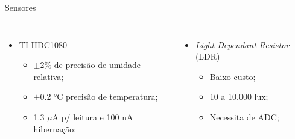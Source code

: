 \begin{frame}{Sensores}

\begin{columns}
        \centering
        \begin{itemize}
            \item TI HDC1080
            \begin{itemize}
                \item $\pm$2\% de precisão de umidade relativa;
                \item $\pm$0.2 °C precisão de temperatura;
                \item 1.3 $\mu$A p/ leitura e 100 nA hibernação;
            \end{itemize}
        \end{itemize}
        
        \centering
        \begin{itemize}
            \item \textit{Light Dependant Resistor} (LDR)
            \begin{itemize}
                \item Baixo custo;
                \item 10 a 10.000 lux;
                \item Necessita de ADC;
            \end{itemize}
        \end{itemize}
        
        
        
\end{columns}



    
\end{frame}

